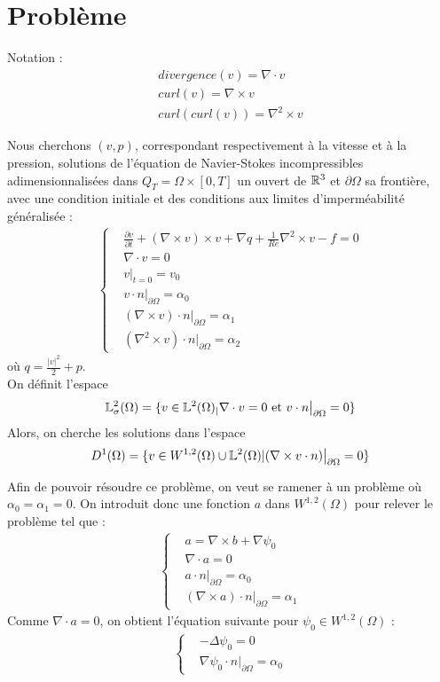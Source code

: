 \section{Problème}
Notation : 
\begin{eqnarray*}
divergence(v)=\nabla\cdot v\\
curl(v)=\nabla\times v\\
curl(curl(v))=\nabla^2\times v
\end{eqnarray*}

Nous cherchons $(v,p)$, correspondant respectivement à la vitesse et à la pression, solutions de l'équation de Navier-Stokes incompressibles adimensionnalisées dans $Q_T=\Omega\times[0,T]$ un ouvert de ${\mathbb{R}}^3$ et $\partial\Omega$ sa frontière, avec une condition initiale et des conditions aux limites d'imperméabilité généralisée :
\begin{eqnarray}
\label{depart}
\left\{
\begin{aligned}
&\frac{\partial v}{\partial t} + (\nabla\times  v)\times v + \nabla q + \frac{1}{Re}\nabla^2\times  v-f = 0\\
&\nabla\cdot v = 0\\
&v\big\rvert_{t=0} = v_0\\
&v\cdot n\big\rvert_{\partial\Omega} = \alpha_0\\
&(\nabla\times  v)\cdot n\big\rvert_{\partial\Omega} = \alpha_1\\
&(\nabla^2\times  v)\cdot n\big\rvert_{\partial\Omega} = \alpha_2
\end{aligned}
\right.
\end{eqnarray}
où $q = \frac{|v|^2}{2}+p$.\\

On définit l'espace
\[
{\mathbb{L}}^2_\sigma(\Omega) = \{v \in {\mathbb{L}}^2(\Omega)_| \nabla\cdot v = 0\text{ et }v\cdot n\big\rvert_{\partial\Omega} = 0 \}
\]
Alors, on cherche les solutions dans l'espace
\[
D^1(\Omega) = \{v\in W^{1,2}(\Omega) \cup {\mathbb{L}}^2(\Omega) | (\nabla\times v\cdot n)\big\rvert_{\partial\Omega} = 0  \}
\]

Afin de pouvoir résoudre ce problème, on veut se ramener à un problème où $\alpha_0=\alpha_1=0$. On introduit donc une fonction $a$ dans $W^{1,2}(\Omega)$ pour relever le problème tel que :
\begin{eqnarray}
\label{aegal}
\left\{
\begin{aligned}
&a=\nabla\times b+\nabla\psi_0\\
&\nabla\cdot a =0\\
&a\cdot n\big\rvert_{\partial\Omega} = \alpha_0\\
&(\nabla\times a)\cdot n\big\rvert_{\partial\Omega} = \alpha_1
\end{aligned}
\right.
\end{eqnarray}
Comme $\nabla\cdot a=0$, on obtient l'équation suivante pour $\psi_0\in W^{1,2}(\Omega)$ :
\begin{eqnarray}
\label{psi0}
\left\{
\begin{aligned}
&-\Delta\psi_0 = 0\\
&\nabla\psi_0\cdot n\big\rvert_{\partial\Omega}=\alpha_0
\end{aligned}
\right.
\end{eqnarray}

